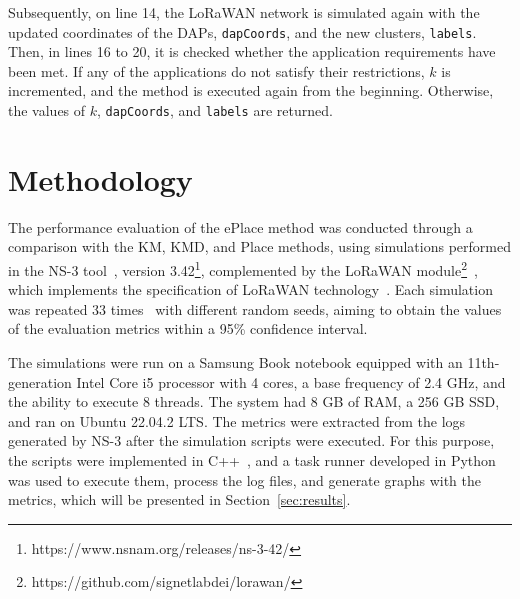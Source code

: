 \documentclass[a4paper,fleqn]{cas-dc}
\begin{document}
Subsequently, on line 14, the LoRaWAN network is simulated again with the updated coordinates of the \gls{DAPs}, \texttt{dapCoords}, and the new clusters, \texttt{labels}. Then, in lines 16 to 20, it is checked whether the application requirements have been met. If any of the applications do not satisfy their restrictions, \texttt{\( k \)} is incremented, and the method is executed again from the beginning. Otherwise, the values of \texttt{\( k \)}, \texttt{dapCoords}, and \texttt{labels} are returned.

\section{Methodology} \label{sec:methodology}

The performance evaluation of the ePlace method was conducted through a comparison with the KM, KMD, and Place methods, using simulations performed in the \gls{NS-3} tool~\cite{campanile2020computer, citoni2022sim}, version 3.42\footnote{https://www.nsnam.org/releases/ns-3-42/}, complemented by the LoRaWAN module\footnote{https://github.com/signetlabdei/lorawan/}~\cite{magrin2020lora, ali2024tiny}, which implements the specification of LoRaWAN technology~\cite{magrin2020lora}. Each simulation was repeated 33 times~\cite{matni2020lorawan} with different random seeds, aiming to obtain the values of the evaluation metrics within a 95\% confidence interval. 

The simulations were run on a Samsung Book notebook equipped with an 11th-generation Intel Core i5 processor with 4 cores, a base frequency of 2.4 GHz, and the ability to execute 8 threads. The system had 8 GB of RAM, a 256 GB SSD, and ran on Ubuntu 22.04.2 LTS. The metrics were extracted from the logs generated by \gls{NS-3} after the simulation scripts were executed. For this purpose, the scripts were implemented in C++~\cite{cpluplus2022}, and a task runner developed in Python was used to execute them, process the log files, and generate graphs with the metrics, which will be presented in Section~\ref{sec:results}.
\end{document}
